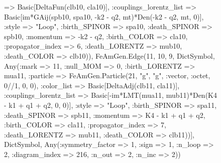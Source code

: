 \documentclass{revtex4}
\begin{document}
\begin{figure}[!htb]
\begin{center}
{=> Basic[DeltaFun(clb10, cla10)], :couplings_lorentz_list => Basic[im*GAij(spb10, spa10, -k2 - q2, mt)*Den(-k2 - q2, mt, 0)], :style => "Loop", :birth_SPINOR => spa10, :death_SPINOR => spb10, :momentum => -k2 - q2, :birth_COLOR => cla10, :propagator_index => 6, :death_LORENTZ => mub10, :death_COLOR => clb10)), FeAmGen.Edge(11, 10, 9, Dict{Symbol, Any}(:mark => 11, :null_MOM => 0, :birth_LORENTZ => mua11, :particle => FeAmGen.Particle(21, "g", "g", :vector, :octet, 0//1, 0, 0), :color_list => Basic[DeltaAdj(clb11, cla11)], :couplings_lorentz_list => Basic[-im*LMT(mua11, mub11)*Den(K4 - k1 + q1 + q2, 0, 0)], :style => "Loop", :birth_SPINOR => spa11, :death_SPINOR => spb11, :momentum => K4 - k1 + q1 + q2, :birth_COLOR => cla11, :propagator_index => 7, :death_LORENTZ => mub11, :death_COLOR => clb11))], Dict{Symbol, Any}(:symmetry_factor => 1, :sign => 1, :n_loop => 2, :diagram_index => 216, :n_out => 2, :n_inc => 2)) 
}
\end{center}
\end{figure}
\end{document}
